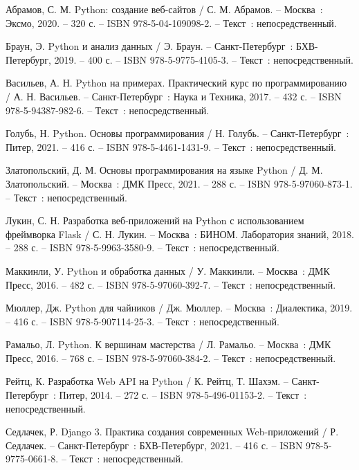 
\begin{thebibliography}{9}
	
	 Абрамов, С. М. Python: создание веб-сайтов / С. М. Абрамов. – Москва~: Эксмо, 2020. – 320 с. – ISBN 978-5-04-109098-2. – Текст~: непосредственный.
	
	 Браун, Э. Python и анализ данных / Э. Браун. – Санкт-Петербург~: БХВ-Петербург, 2019. – 400 с. – ISBN 978-5-9775-4105-3. – Текст~: непосредственный.
	
	 Васильев, А. Н. Python на примерах. Практический курс по программированию / А. Н. Васильев. – Санкт-Петербург~: Наука и Техника, 2017. – 432 с. – ISBN 978-5-94387-982-6. – Текст~: непосредственный.
	
	 Голубь, Н. Python. Основы программирования / Н. Голубь. – Санкт-Петербург~: Питер, 2021. – 416 с. – ISBN 978-5-4461-1431-9. – Текст~: непосредственный.
	
	 Златопольский, Д. М. Основы программирования на языке Python / Д. М. Златопольский. – Москва~: ДМК Пресс, 2021. – 288 с. – ISBN 978-5-97060-873-1. – Текст~: непосредственный.
	
	 Лукин, С. Н. Разработка веб-приложений на Python с использованием фреймворка Flask / С. Н. Лукин. – Москва~: БИНОМ. Лаборатория знаний, 2018. – 288 с. – ISBN 978-5-9963-3580-9. – Текст~: непосредственный.
	
	 Маккинли, У. Python и обработка данных / У. Маккинли. – Москва~: ДМК Пресс, 2016. – 482 с. – ISBN 978-5-97060-392-7. – Текст~: непосредственный.
	
	 Мюллер, Дж. Python для чайников / Дж. Мюллер. – Москва~: Диалектика, 2019. – 416 с. – ISBN 978-5-907114-25-3. – Текст~: непосредственный.
	
	 Рамальо, Л. Python. К вершинам мастерства / Л. Рамальо. – Москва~: ДМК Пресс, 2016. – 768 с. – ISBN 978-5-97060-384-2. – Текст~: непосредственный.
	
	 Рейтц, К. Разработка Web API на Python / К. Рейтц, Т. Шахэм. – Санкт-Петербург~: Питер, 2014. – 272 с. – ISBN 978-5-496-01153-2. – Текст~: непосредственный.
	
	 Седлачек, Р. Django 3. Практика создания современных Web-приложений / Р. Седлачек. – Санкт-Петербург~: БХВ-Петербург, 2021. – 416 с. – ISBN 978-5-9775-0661-8. – Текст~: непосредственный.
	

\end{thebibliography}
